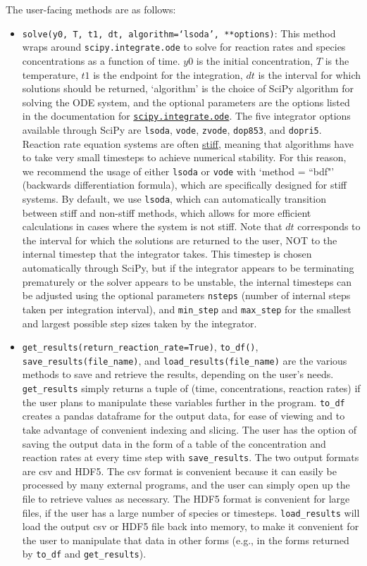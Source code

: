 \documentclass[12pt]{article}
\begin{document}
The user-facing methods are as follows: 
\begin{itemize}
\item \texttt{solve(y0, T, t1, dt, algorithm=`lsoda', **options)}: This method wraps around \texttt{scipy.integrate.ode} to solve for reaction rates and species concentrations as a function of time. $y0$ is the initial concentration, $T$ is the temperature, $t1$ is the endpoint for the integration, $dt$ is the interval for which solutions should be returned, `algorithm' is the choice of SciPy algorithm for solving the ODE system, and the optional parameters are the options listed in the documentation for \href{https://docs.scipy.org/doc/scipy/reference/generated/scipy.integrate.ode.html}{\texttt{scipy.integrate.ode}}. The five integrator options available through SciPy are \texttt{lsoda}, \texttt{vode}, \texttt{zvode}, \texttt{dop853}, and \texttt{dopri5}. Reaction rate equation systems are often \href{https://www.mathworks.com/help/matlab/math/solve-stiff-odes.html}{stiff}, meaning that algorithms have to take very small timesteps to achieve numerical stability. For this reason, we recommend the usage of either \texttt{lsoda} or \texttt{vode} with `method = ``bdf"' (backwards differentiation formula), which are specifically designed for stiff systems. By default, we use \texttt{lsoda}, which can automatically transition between stiff and non-stiff methods, which allows for more efficient calculations in cases where the system is not stiff. Note that $dt$ corresponds to the interval for which the solutions are returned to the user, NOT to the internal timestep that the integrator takes. This timestep is chosen automatically through SciPy, but if the integrator appears to be terminating prematurely or the solver appears to be unstable, the internal timesteps can be adjusted using the optional parameters \texttt{nsteps} (number of internal steps taken per integration interval), and \texttt{min\_step} and \texttt{max\_step} for the smallest and largest possible step sizes taken by the integrator. 
\item \texttt{get\_results(return\_reaction\_rate=True)}, \texttt{to\_df()}, \texttt{save\_results(file\_name)}, and \texttt{load\_results(file\_name)} are the various methods to save and retrieve the results, depending on the user's needs. \texttt{get\_results} simply returns a tuple of (time, concentrations, reaction rates) if the user plans to manipulate these variables further in the program. \texttt{to\_df} creates a pandas dataframe for the output data, for ease of viewing and to take advantage of convenient indexing and slicing. The user has the option of saving the output data in the form of a table of the concentration and reaction rates at every time step with \texttt{save\_results}. The two output formats are csv and HDF5. The csv format is convenient because it can easily be processed by many external programs, and the user can simply open up the file to retrieve values as necessary. The HDF5 format is convenient for large files, if the user has a large number of species or timesteps. \texttt{load\_results} will load the output csv or HDF5 file back into memory, to make it convenient for the user to manipulate that data in other forms (e.g., in the forms returned by \texttt{to\_df} and \texttt{get\_results}). 

\end{itemize}
\end{document}
